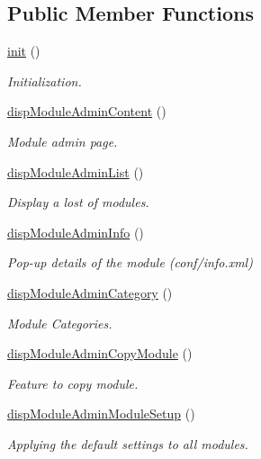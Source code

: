 \subsection*{Public Member Functions}
\begin{DoxyCompactItemize}
\item 
\hyperlink{classmoduleAdminView_a9b5d1a3f7dc566edd3c5f381e19438b7}{init} ()
\begin{DoxyCompactList}\small\item\em Initialization. \end{DoxyCompactList}\item 
\hyperlink{classmoduleAdminView_a1b5edba3a516dd443b323743330ded45}{disp\-Module\-Admin\-Content} ()
\begin{DoxyCompactList}\small\item\em Module admin page. \end{DoxyCompactList}\item 
\hyperlink{classmoduleAdminView_a9fcb82dc32bc423eda912b34d0cabd00}{disp\-Module\-Admin\-List} ()
\begin{DoxyCompactList}\small\item\em Display a lost of modules. \end{DoxyCompactList}\item 
\hyperlink{classmoduleAdminView_abb4989ee97d80a1f9a04a3f8364807c0}{disp\-Module\-Admin\-Info} ()
\begin{DoxyCompactList}\small\item\em Pop-\/up details of the module (conf/info.\-xml) \end{DoxyCompactList}\item 
\hyperlink{classmoduleAdminView_a1e6312f7a841064603ba51ad835f4e28}{disp\-Module\-Admin\-Category} ()
\begin{DoxyCompactList}\small\item\em Module Categories. \end{DoxyCompactList}\item 
\hyperlink{classmoduleAdminView_aa9846c36dd6d640677eb6c9ac237e28f}{disp\-Module\-Admin\-Copy\-Module} ()
\begin{DoxyCompactList}\small\item\em Feature to copy module. \end{DoxyCompactList}\item 
\hyperlink{classmoduleAdminView_a3af1bd27e1da3bc8e31815d109a476da}{disp\-Module\-Admin\-Module\-Setup} ()
\begin{DoxyCompactList}\small\item\em Applying the default settings to all modules. \end{DoxyCompactList}\item 

\end{DoxyCompactItemize}
